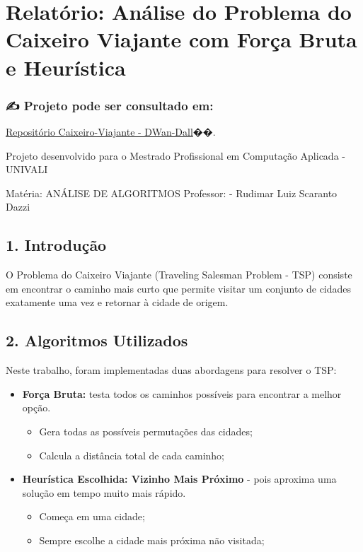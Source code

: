 \documentclass[
]{article}
\author{}
\date{\vspace{-2.5em}}
\providecommand{\tightlist}{%
  \setlength{\itemsep}{0pt}\setlength{\parskip}{0pt}}
\begin{document}
\hypertarget{relatuxf3rio-anuxe1lise-do-problema-do-caixeiro-viajante-com-foruxe7a-bruta-e-heuruxedstica}{%
\section{Relatório: Análise do Problema do Caixeiro Viajante com Força
Bruta e
Heurística}\label{relatuxf3rio-anuxe1lise-do-problema-do-caixeiro-viajante-com-foruxe7a-bruta-e-heuruxedstica}}


\hypertarget{autoria}{%
\subsubsection{✍️ Projeto pode ser consultado em:}\label{autoria}}

\href{https://github.com/DWan-Dall/caixeiro-viajante}{Repositório Caixeiro-Viajante - DWan-Dall}��.

Projeto desenvolvido para o Mestrado Profissional em Computação Aplicada
- UNIVALI

Matéria: ANÁLISE DE ALGORITMOS Professor: 
- Rudimar Luiz Scaranto Dazzi

\hypertarget{introduuxe7uxe3o}{%
\subsection{1. Introdução}\label{introduuxe7uxe3o}}

O Problema do Caixeiro Viajante (Traveling Salesman Problem - TSP)
consiste em encontrar o caminho mais curto que permite visitar um
conjunto de cidades exatamente uma vez e retornar à cidade de origem.

\hypertarget{algoritmos-utilizados}{%
\subsection{2. Algoritmos Utilizados}\label{algoritmos-utilizados}}

Neste trabalho, foram implementadas duas abordagens para resolver o TSP:

\begin{itemize}
\tightlist
\item
  \textbf{Força Bruta:} testa todos os caminhos possíveis para encontrar
  a melhor opção.

  \begin{itemize}
  \tightlist
  \item
    Gera todas as possíveis permutações das cidades;
  \item
    Calcula a distância total de cada caminho;
  \end{itemize}
\item
  \textbf{Heurística Escolhida: Vizinho Mais Próximo} - pois aproxima
  uma solução em tempo muito mais rápido.

  \begin{itemize}
  \tightlist
  \item
    Começa em uma cidade;
  \item
    Sempre escolhe a cidade mais próxima não visitada;
  \end{itemize}
\end{itemize}
\end{document}
